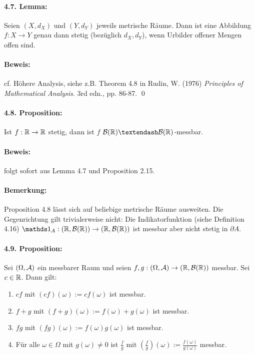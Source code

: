  \paragraph{4.7. Lemma:}Seien $(X,d_X)$ und $(Y,d_Y)$ jeweils metrische R\"aume. Dann ist eine Abbildung $f:X\to Y$ genau dann stetig (bez\"uglich $d_X,d_Y$), wenn Urbilder offener Mengen offen sind.
 
 \paragraph{Beweis:}cf. H\"ohere Analysis, siehe z.B. Theorem 4.8 in Rudin, W. (1976) \textit{Principles of Mathematical Analysis}. 3rd edn., pp. 86-87. \qed
 
 \paragraph{4.8. Proposition:}Ist $f:\mathbb{R}\to\mathbb{R}$ stetig, dann ist $f$ $\borel\textendash\borel$-messbar. 
 
 \paragraph{Beweis:}folgt sofort aus Lemma 4.7 und Proposition 2.15. \qedsymbol
 
 \paragraph{Bemerkung:}Proposition 4.8 l\"asst sich auf beliebige metrische R\"aume ausweiten. Die Gegenrichtung gilt trivialerweise nicht: Die Indikatorfunktion (siehe Definition 4.16) $\ind{A}:(\R, \mathcal{B}(\R))\to(\R, \mathcal{B}(\R))$ ist messbar aber nicht stetig in $\partial A$. 
 
 \paragraph{4.9. Proposition:}Sei $(\Omega,\mathcal{A})$ ein messbarer Raum und seien $f,g:(\Omega,\mathcal{A})\to(\mathbb{R},\mathcal{B}(\mathbb{R}))$ messbar. Sei $c\in\mathbb{R}$. Dann gilt:
 \begin{enumerate}[label=(\roman*)]
     \item $cf$ mit $(cf)(\omega):=cf(\omega)$ ist messbar.
     \item $f+g$ mit $(f+g)(\omega):=f(\omega)+g(\omega)$ ist messbar.
     \item $fg$ mit $(fg)(\omega):=f(\omega)g(\omega)$ ist messbar.
     \item F\"ur alle $\omega\in\Omega$ mit $g(\omega)\neq0$ ist $\frac{f}{g}$ mit $\left(\frac{f}{g}\right)(\omega):=\frac{f(\omega)}{g(\omega)}$ messbar.
  \end{enumerate}
  
